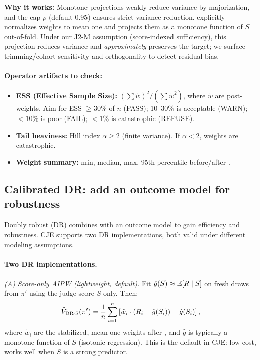 \textbf{Why it works:} Monotone projections weakly reduce variance by majorization, and the cap $\rho$ (default 0.95) ensures strict variance reduction. \simcal{} explicitly normalizes weights to mean one and projects them as a monotone function of $S$ out-of-fold. Under our J2-M assumption (score-indexed sufficiency), this projection reduces variance and \emph{approximately} preserves the target; we surface trimming/cohort sensitivity and orthogonality to detect residual bias.

\paragraph{Operator artifacts to check:}
\begin{itemize}
\item \textbf{ESS (Effective Sample Size):} $({\textstyle\sum} \tilde{w})^2 / ({\textstyle\sum} \tilde{w}^2)$, where $\tilde{w}$ are post-\simcal{} weights. Aim for ESS $\ge 30\%$ of $n$ (PASS); 10--30\% is acceptable (WARN); $< 10\%$ is poor (FAIL); $< 1\%$ is catastrophic (REFUSE).
\item \textbf{Tail heaviness:} Hill index $\alpha \ge 2$ (finite variance). If $\alpha < 2$, weights are catastrophic.
\item \textbf{Weight summary:} min, median, max, 95th percentile before/after \simcal.
\end{itemize}

\subsection{Calibrated DR: add an outcome model for robustness}

Doubly robust (DR) combines \ips{} with an outcome model to gain efficiency and robustness. CJE supports two DR implementations, both valid under different modeling assumptions.

\paragraph{Two DR implementations.}

\emph{(A) Score-only AIPW (lightweight, default).} Fit $\hat{g}(S) \approx \operatorname{\mathbb{E}}[R \mid S]$ on fresh draws from $\pi'$ using the judge score $S$ only. Then:
\begin{equation}
\widehat{V}_{\text{DR-S}}(\pi') = \frac{1}{n} \sum_{i=1}^n \left[ \tilde{w}_i \cdot (R_i - \hat{g}(S_i)) + \hat{g}(S_i) \right],
\end{equation}
where $\tilde{w}_i$ are the stabilized, mean-one weights after \simcal, and $\hat{g}$ is typically a monotone function of $S$ (isotonic regression). This is the default in CJE: low cost, works well when $S$ is a strong predictor.

